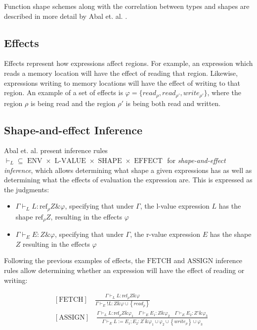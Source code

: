 \noindent Function shape schemes along with the correlation between types and shapes are described in more detail by Abal et. al. \cite{Abal2017EffectiveBF}. 

\subsection{Effects}
Effects represent how expressions affect regions. For example, an expression which reads a memory location will have the effect of reading that region. Likewise, expressions writing to memory locations will have the effect of writing to that region. An example of a set of effects is $\varphi = \{read_\rho , read_{\rho'} , write_{\rho'}\}$, where the region $\rho$ is being read and the region $\rho'$ is being both read and written.

\subsection{Shape-and-effect Inference}
Abal et. al. present inference rules $\vdash_{L} \subseteq \text { ENV } \times \text { L-VALUE } \times \text { SHAPE } \times \text { EFFECT }$ for \textit{shape-and-effect inference}, which allows determining what shape a given expressions has as well as determining what the effects of evaluation the expression are. This is expressed as the judgments: 

\begin{itemize}
    \item $\Gamma \vdash_{L} L: \text{ref}_{\rho} Z \& \varphi$, specifying that under $\Gamma$, the l-value expression $L$ has the shape $\text{ref}_\rho Z$, resulting in the effects $\varphi$
    \item $\Gamma \vdash_{E} E: Z \& \varphi$, specifying that under $\Gamma$, the r-value expression $E$ has the shape $Z$ resulting in the effects $\varphi$
\end{itemize}

\newpar Following the previous examples of effects, the $\text{FETCH}$ and $\text{ASSIGN}$ inference rules allow determining whether an expression will have the effect of reading or writing: 

\begin{equation*}
\begin{aligned}
    &[\text{FETCH}] \quad \frac{\Gamma \vdash_{L} L: \text{ref}_{\rho} Z \& \varphi}{\Gamma \vdash_{E} {!L}: Z \& \varphi \cup\left\{r e a d_{\rho}\right\}}\\
    &[\text{ASSIGN}] \quad \frac{\Gamma \vdash_{L} L: \mathrm{ref}_{\rho} Z \& \varphi_{1} \quad \Gamma \vdash_{E} E_{1}: Z \& \varphi_{2} \quad \Gamma \vdash_{E} E_{2}: Z' \& \varphi_{3}}{\Gamma \vdash_{E} L:=E_{1} ; E_{2}: Z^{\prime} \& \varphi_{1} \cup \varphi_{2} \cup\left\{w r i t e_{\rho}\right\} \cup \varphi_{3}}
\end{aligned}
\end{equation*}

